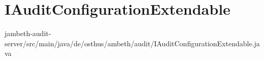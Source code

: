 \section{IAuditConfigurationExtendable}
\label{extendable:IAuditConfigurationExtendable}
	{jambeth-audit-server/src/main/java/de/osthus/ambeth/audit/IAuditConfigurationExtendable.java}

